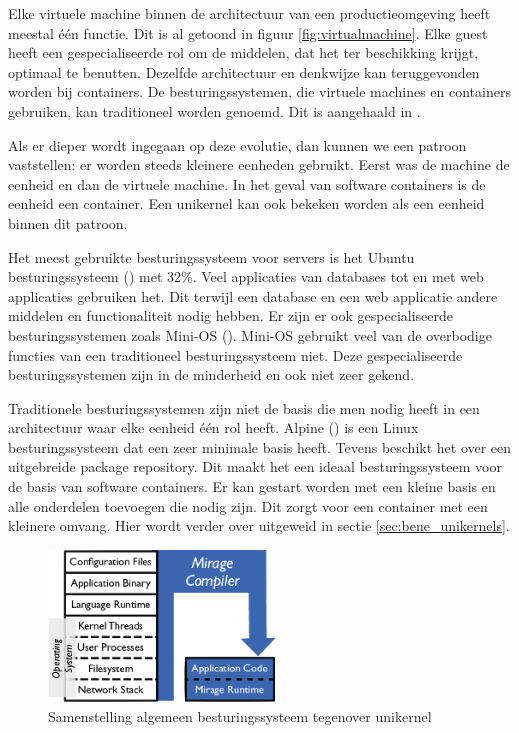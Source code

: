 Elke virtuele machine binnen de architectuur van een productieomgeving heeft meestal één functie. Dit is al getoond in figuur \ref{fig:virtualmachine}. Elke guest heeft een gespecialiseerde rol om de middelen, dat het ter beschikking krijgt, optimaal te benutten.
Dezelfde architectuur en denkwijze kan teruggevonden worden bij containers. De besturingssystemen, die virtuele machines en containers gebruiken, kan traditioneel worden genoemd. Dit is aangehaald in \cite{madhavapeddy_unikernels_2013}.

Als er dieper wordt ingegaan op deze evolutie, dan kunnen we een patroon vaststellen: er worden steeds kleinere eenheden gebruikt. Eerst was de machine de eenheid en dan de virtuele machine. In het geval van software containers is de eenheid een container. Een unikernel kan ook bekeken worden als een eenheid binnen dit patroon.

Het meest gebruikte besturingssysteem voor servers is het Ubuntu besturingssysteem (\cite{matthias_gelbmann_ubuntu_2016}) met 32\%. Veel applicaties van databases tot en met web applicaties gebruiken het. Dit terwijl een database en een web applicatie andere middelen en functionaliteit nodig hebben.
Er zijn er ook gespecialiseerde besturingssystemen zoals Mini-OS (\cite{satya_popuri_tour_????}). Mini-OS gebruikt veel van de overbodige functies van een traditioneel besturingssysteem niet. Deze gespecialiseerde besturingssystemen zijn in de minderheid en ook niet zeer gekend.

Traditionele besturingssystemen zijn niet de basis die men nodig heeft in een architectuur waar elke eenheid één rol heeft. Alpine (\cite{alpine_linux_development_team_alpine_????}) is een Linux besturingssysteem dat een zeer minimale basis heeft. Tevens beschikt het over een uitgebreide package repository. Dit maakt het een ideaal besturingssysteem voor de basis van software containers. Er kan gestart worden met een kleine basis en alle onderdelen toevoegen die nodig zijn. Dit zorgt voor een container met een kleinere omvang. Hier wordt verder over uitgeweid in sectie \ref{sec:bene_unikernels}.

\begin{figure}
    \centering
    \includegraphics[width=6cm]{img/unikernel}
    \caption[samenstelling algemeen besturingssysteem en unikernel]{Samenstelling algemeen besturingssysteem tegenover unikernel \cite{madhavapeddy_unikernels_2013}}
    \label{fig:unikernel}
\end{figure}

